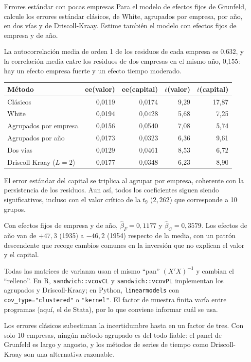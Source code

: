 \begin{ejresuelto}{Errores estándar con pocas empresas}\label{ej:errores}
\enunciado Para el modelo de efectos fijos de Grunfeld, calcule los errores estándar clásicos, de White, agrupados por empresa, por
año, en dos vías y de Driscoll-Kraay. Estime también el modelo con efectos fijos de empresa y de año.

\solucion
{} La autocorrelación media de orden 1 de los residuos de cada empresa es 0,632, y la
correlación media entre los residuos de dos empresas en el mismo año, 0,155: hay un efecto empresa fuerte y un efecto tiempo moderado.

\begin{center}\small
\begin{tabular}{@{}lrrrr@{}}
\toprule
Método & ee(valor) & ee(capital) & $t$(valor) & $t$(capital) \\
\midrule
Clásicos & 0,0119 & 0,0174 & 9,29 & 17,87 \\
White & 0,0194 & 0,0428 & 5,68 & 7,25 \\
Agrupados por empresa & 0,0156 & 0,0540 & 7,08 & 5,74 \\
Agrupados por año & 0,0173 & 0,0323 & 6,36 & 9,61 \\
Dos vías & 0,0129 & 0,0461 & 8,53 & 6,72 \\
Driscoll-Kraay ($L=2$) & 0,0177 & 0,0348 & 6,23 & 8,90 \\
\bottomrule
\end{tabular}
\end{center}
El error estándar del capital se triplica al agrupar por empresa, coherente con la persistencia de los residuos. Aun así, todos los
coeficientes siguen siendo significativos, incluso con el valor crítico de la $t_9$ ($2{,}262$) que corresponde a 10 grupos.

 Con efectos fijos de empresa y de año, $\hat\beta_F=0{,}1177$ y $\hat\beta_C=0{,}3579$. Los efectos de año van de
$+47{,}3$ (1935) a $-46{,}2$ (1954) respecto de la media, con un patrón descendente que recoge cambios comunes en la inversión que
no explican el valor y el capital.


\RvsPy Todas las matrices de varianza usan el mismo ``pan'' $(X'X)^{-1}$ y cambian el ``relleno''. En R, \texttt{sandwich::vcovCL}
y \texttt{sandwich::vcovPL} implementan los agrupados y Driscoll-Kraay; en Python, \texttt{linearmodels} con
\texttt{cov\_type="clustered"} o \texttt{"kernel"}. El factor de muestra finita varía entre programas (aquí, el de Stata), por lo
que conviene informar cuál se usa.

\begin{conclusion}
Los errores clásicos subestiman la incertidumbre hasta en un factor de tres. Con solo 10 empresas, ningún método agrupado es del
todo fiable: el panel de Grunfeld es largo y angosto, y los métodos de series de tiempo como Driscoll-Kraay son una alternativa
razonable.
\end{conclusion}
\end{ejresuelto}

